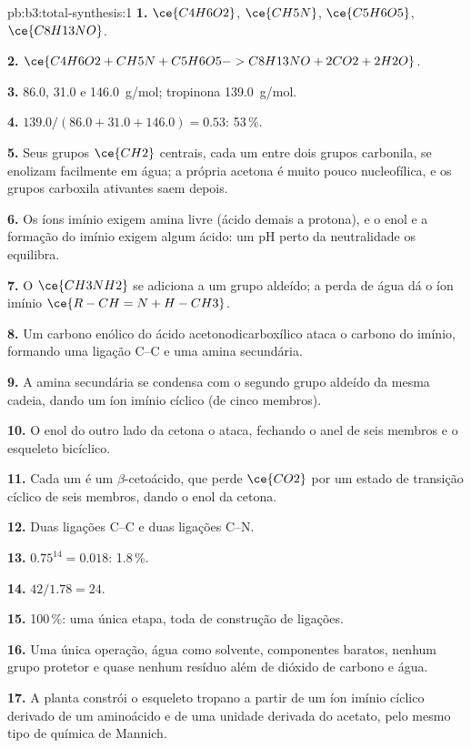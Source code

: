 \begin{solution}{pb:b3:total-synthesis:1}
\textbf{1.} $\ce{C4H6O2}$, $\ce{CH5N}$, $\ce{C5H6O5}$, $\ce{C8H13NO}$.

\textbf{2.} $\ce{C4H6O2 + CH5N + C5H6O5 -> C8H13NO + 2CO2 + 2H2O}$.

\textbf{3.} 86.0, 31.0 e \qty{146.0}{g/mol}; tropinona \qty{139.0}{g/mol}.

\textbf{4.} $139.0/(86.0 + 31.0 + 146.0) = 0.53$: 53\,\%.

\textbf{5.} Seus grupos $\ce{CH2}$ centrais, cada um entre dois grupos carbonila, se enolizam facilmente em
água; a própria acetona é muito pouco nucleofílica, e os grupos carboxila ativantes
saem depois.

\textbf{6.} Os íons imínio exigem amina livre (ácido demais a protona), e o
enol e a formação do imínio exigem algum ácido: um pH perto da neutralidade os equilibra.

\textbf{7.} O $\ce{CH3NH2}$ se adiciona a um grupo aldeído; a perda de água dá o íon imínio
$\ce{R-CH=N+H-CH3}$.

\textbf{8.} Um carbono enólico do ácido acetonodicarboxílico ataca o carbono do imínio, formando uma
ligação C--C e uma amina secundária.

\textbf{9.} A amina secundária se condensa com o segundo grupo aldeído da mesma
cadeia, dando um íon imínio cíclico (de cinco membros).

\textbf{10.} O enol do outro lado da cetona o ataca, fechando o
anel de seis membros e o esqueleto bicíclico.

\textbf{11.} Cada um é um $\beta$-cetoácido, que perde $\ce{CO2}$ por um estado de transição cíclico de seis
membros, dando o enol da cetona.

\textbf{12.} Duas ligações C--C e duas ligações C--N.

\textbf{13.} $0.75^{14} = 0.018$: 1.8\,\%.

\textbf{14.} $42/1.78 = 24$.

\textbf{15.} 100\,\%: uma única etapa, toda de construção de ligações.

\textbf{16.} Uma única operação, água como solvente, componentes baratos, nenhum grupo protetor e
quase nenhum resíduo além de dióxido de carbono e água.

\textbf{17.} A planta constrói o esqueleto tropano a partir de um íon imínio cíclico derivado de um
aminoácido e de uma unidade derivada do acetato, pelo mesmo tipo de química de
Mannich.


\end{solution}
